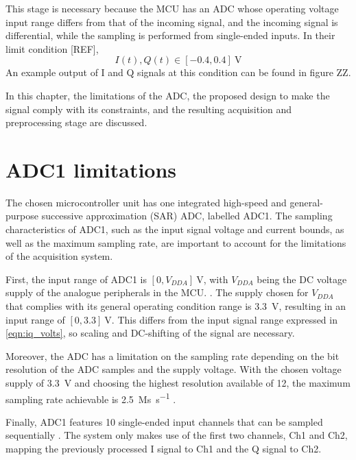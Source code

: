 This stage is necessary because the MCU has an ADC whose operating voltage input range differs from that of the incoming signal, and the incoming signal is differential, while the sampling is performed from single-ended inputs. In their limit condition [REF],
\begin{equation} \label{eqn:iq_volts}
	I(t), Q(t) \in [-0.4, 0.4]\ \si{\volt}
\end{equation}
An example output of I and Q signals at this condition can be found in figure ZZ.

In this chapter, the limitations of the ADC, the proposed design to make the signal comply with its constraints, and the resulting acquisition and preprocessing stage are discussed.

\section{ADC1 limitations}

The chosen microcontroller unit has one integrated high-speed and general-purpose successive approximation (SAR) ADC, labelled ADC1. The sampling characteristics of ADC1, such as the input signal voltage and current bounds, as well as the maximum sampling rate, are important to account for the limitations of the acquisition system.

First, the input range of ADC1 is $[0, V_{DDA}]\ \si{\volt}$, with $V_{DDA}$ being the DC voltage supply of the analogue peripherals in the MCU.
\cite[p.~103]{STMicroelectronics2022}. The supply chosen for $V_{DDA}$ that complies with its general operating condition range \cite[p.~62]{STMicroelectronics2022} is \SI{3.3}{\volt}, resulting in an input range of $[0, 3.3]\ \si{\volt}$. This differs from the input signal range expressed in \cref{eqn:iq_volts}, so scaling and DC-shifting of the signal are necessary.

Moreover, the ADC has a limitation on the sampling rate depending on the bit resolution of the ADC samples and the supply voltage. With the chosen voltage supply of \SI{3.3}{\volt} and choosing the highest resolution available of \SI{12}{\bit}, the maximum sampling rate achievable is \SI{2.5}{\mega s\per\second} \cite[p.~103]{STMicroelectronics2022}. 

Finally, ADC1 features 10 single-ended input channels that can be sampled sequentially \cite[p.~355]{STMicroelectronics2022a}. The system only makes use of the first two channels, Ch1 and Ch2, mapping the previously processed I signal to Ch1 and the Q signal to Ch2.

